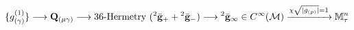 \documentclass[preview]{standalone}
\begin{document}
\begin{align*}
\special{dvisvgm:raw <g id='unique000'>}\{g_{(\gamma)}^{(1)}\} \longrightarrow \mathbf{Q}_{(\mu\gamma)} \longrightarrow 36\text{-Hermetry }({}^2\bar{\mathbf{g}}_+ + {}^2\bar{\mathbf{g}}_-) \longrightarrow {}^2\bar{\mathbf{g}}_\infty \in C^\infty(\mathcal{M}) \xrightarrow{\chi\sqrt{|g_{(p)}|}=1} \mathbb{M}_\tau^n\special{dvisvgm:raw </g>}
\end{align*}
\end{document}
